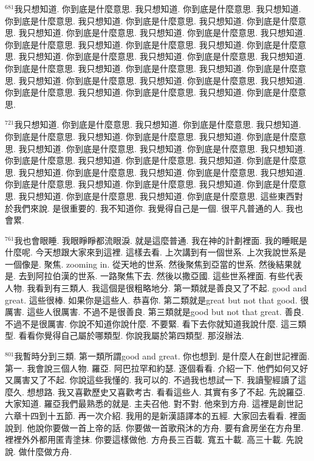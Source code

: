 \documentclass{book}
\begin{document}
$^{681}$我只想知道.
你到底是什麼意思.
我只想知道.
你到底是什麼意思.
我只想知道.
你到底是什麼意思.
我只想知道.
你到底是什麼意思.
我只想知道.
你到底是什麼意思.
我只想知道.
你到底是什麼意思.
我只想知道.
你到底是什麼意思.
我只想知道.
你到底是什麼意思.
我只想知道.
你到底是什麼意思.
我只想知道.
你到底是什麼意思.
我只想知道.
你到底是什麼意思.
我只想知道.
你到底是什麼意思.
我只想知道.
你到底是什麼意思.
我只想知道.
你到底是什麼意思.
我只想知道.
你到底是什麼意思.
我只想知道.
你到底是什麼意思.
我只想知道.
你到底是什麼意思.
我只想知道.
你到底是什麼意思.
我只想知道.
你到底是什麼意思.
我只想知道.
你到底是什麼意思.

$^{721}$我只想知道.
你到底是什麼意思.
我只想知道.
你到底是什麼意思.
我只想知道.
你到底是什麼意思.
我只想知道.
你到底是什麼意思.
我只想知道.
你到底是什麼意思.
我只想知道.
你到底是什麼意思.
我只想知道.
你到底是什麼意思.
我只想知道.
你到底是什麼意思.
我只想知道.
你到底是什麼意思.
我只想知道.
你到底是什麼意思.
我只想知道.
你到底是什麼意思.
我只想知道.
你到底是什麼意思.
我只想知道.
你到底是什麼意思.
我只想知道.
你到底是什麼意思.
我只想知道.
你到底是什麼意思.
我只想知道.
你到底是什麼意思.
我只想知道.
你到底是什麼意思.
這些東西對於我們來說.
是很重要的.
我不知道你.
我覺得自己是一個.
很平凡普通的人.
我也會累.

$^{761}$我也會眼睡.
我眼睜睜都流眼淚.
就是這麼普通.
我在神的計劃裡面.
我的睡眠是什麼呢.
今天想跟大家來到這裡.
這樣去看.
上次講到有一個世系.
上次我說世系是一個像是.
聚焦.
zooming in.
從天地的世系.
然後聚焦到亞當的世系.
然後結果就是.
去到阿拉伯漢的世系.
一路聚焦下去.
然後以撒亞國.
這些世系裡面.
有些代表人物.
我看到有三類人.
我這個是很粗略地分.
第一類就是善良又了不起.
good and great.
這些很棒.
如果你是這些人.
恭喜你.
第二類就是great but not that good.
很厲害.
這些人很厲害.
不過不是很善良.
第三類就是good but not that great.
善良.
不過不是很厲害.
你說不知道你說什麼.
不要緊.
看下去你就知道我說什麼.
這三類型.
看看你覺得自己屬於哪類型.
你說我屬於第四類型.
那沒辦法.

$^{801}$我暫時分到三類.
第一類所謂good and great.
你也想到.
是什麼人在創世記裡面.
第一.
我會說三個人物.
羅亞.
阿巴拉罕和約瑟.
逐個看看.
介紹一下.
他們如何又好又厲害又了不起.
你說這些我懂的.
我可以的.
不過我也想試一下.
我讀聖經讀了這麼久.
想想路.
我又喜歡歷史又喜歡考古.
看看這些人.
其實有多了不起.
先說羅亞.
大家知道.
羅亞我們最熟悉的就是.
主夫召他.
對不對.
他來到方舟.
這裡是創世記六章十四到十五節.
再一次介紹.
我用的是新漢語譯本的五經.
大家回去看看.
裡面說到.
他說你要做一首上帝的話.
你要做一首歌飛沐的方舟.
要有倉房坐在方舟里.
裡裡外外都用匿青塗抹.
你要這樣做他.
方舟長三百載.
寬五十載.
高三十載.
先說說.
做什麼做方舟.
\end{document}
